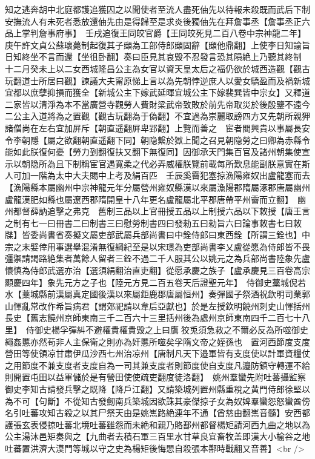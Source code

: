 知之逃奔胡中北庭都護追獲囚之以聞使者至流人盡死伷先以待報未殺既而武后下制安撫流人有未死者悉放還伷先由是得歸至是求炎後獨伷先在拜詹事丞【詹事丞正六品上掌判詹事府事】　壬戌追復王同皎官爵【王同皎死見二百八卷中宗神龍二年】庚午許文貞公蘇瓌薨制起復其子頲為工部侍郎頲固辭【頲他鼎翻】上使李日知諭旨日知終坐不言而還【坐徂卧翻】奏曰臣見其哀毁不忍發言恐其隕絶上乃聽其終制　十二月癸未上以二女西城隆昌公主為女官以資天皇太后之福仍欲於城西造觀【觀古玩翻道士所居曰觀】諫議大夫甯原悌上言以為先朝悖逆庶人以愛女驕盈而及禍新城宜都以庶孽抑損而獲全【新城公主下嫁武延暉宜城公主下嫁裴巽皆中宗女】又釋道二家皆以清淨為本不當廣營寺觀勞人費財梁武帝致敗於前先帝取災於後殷鑒不遠今二公主入道將為之置觀【觀古玩翻為于偽翻】不宜過為崇麗取謗四方又先朝所親狎諸僧尚在左右宜加屏斥【朝直遥翻屛卑郢翻】上覽而善之　宦者閻興貴以事屬長安令李朝隱【屬之欲翻朝直遥翻下同】朝隐繫於獄上聞之召見朝隐勞之曰卿為赤縣令能如此朕復何憂【勞力到翻復扶又翻下無復同】因御承天門集百官及諸州朝集使宣示以朝隐所為且下制稱宦官遇寛柔之代必弄威權朕覽前載每所歎息能副朕意實在斯人可加一階為太中大夫賜中上考及絹百匹　壬辰奚霫犯塞掠漁陽雍奴出盧龍塞而去【漁陽縣本屬幽州中宗神龍元年分屬營州雍奴縣漢以來屬漁陽郡隋屬涿郡唐屬幽州盧龍漢肥如縣也屬遼西郡隋開皇十八年更名盧龍屬北平郡唐帶平州霫而立翻】　幽州都督薛訥追擊之弗克　舊制三品以上官冊授五品以上制授六品以下敇授【唐王言之制有七一曰冊書二曰制書三曰慰勞制書四曰發勑五曰勑旨六曰論事敇書七曰敇牒】皆委尚書省奏擬文屬吏部武屬兵部尚書曰中銓侍郎曰東西銓【所謂三銓也】中宗之末嬖倖用事選舉混淆無復綱紀至是以宋璟為吏部尚書李乂盧從愿為侍郎皆不畏彊禦請謁路絶集者萬餘人留者三銓不過二千人服其公以姚元之為兵部尚書陸象先盧懷慎為侍郎武選亦治【選須絹翻治直吏翻】從愿承慶之族子【盧承慶見三百卷高宗顯慶四年】象先元方之子也【陸元方見二百五卷天后證聖元年】　侍御史藳城倪若水【藳城縣前漢屬真定國後漢以來屬鉅鹿郡唐屬恒州】奏彈國子祭酒祝欽明司業郭山惲亂常改作希旨病君【謂郊祀請以韋后亞獻也】於是左授欽明饒州刺史山惲括州長史【舊志饒州京師東南三千二百六十三里括州後為處州京師東南四千二百七十八里】　侍御史楊孚彈糾不避權貴權貴毁之上曰鷹狡兎須急救之不爾必反為所噬御史繩姦慝亦然苟非人主保衛之則亦為奸慝所噬矣孚隋文帝之姪孫也　置河西節度支度營田等使領凉甘肅伊瓜沙西七州治凉州【唐制凡天下邉軍皆有支度使以計軍資糧仗之用節度不兼支度者支度自為一司其兼支度者則節度使自支度凡邉防鎮守轉運不給則開置屯田以益軍儲於是有營田使使疏吏翻度徒洛翻】　姚州羣蠻先附吐蕃攝監察御史李知古請發兵擊之既降【降戶江翻】又請築城列置州縣重稅之黄門侍郎徐堅以為不可【句斷】不從知古發劒南兵築城因欲誅其豪傑掠子女為奴婢羣蠻怨怒蠻酋傍名引吐蕃攻知古殺之以其尸祭天由是姚嶲路絶連年不通【酋慈由翻嶲音髓】安西都護張玄表侵掠吐蕃北境吐蕃雖怨而未絶和親乃賂鄯州都督楊矩請河西九曲之地以為公主湯沐邑矩奏與之【九曲者去積石軍三百里水甘草良宜畜牧盖即漢大小榆谷之地吐蕃置洪濟大漠門等城以守之史為楊矩後悔愳自殺張本鄯時戰翻又音善】<br />
